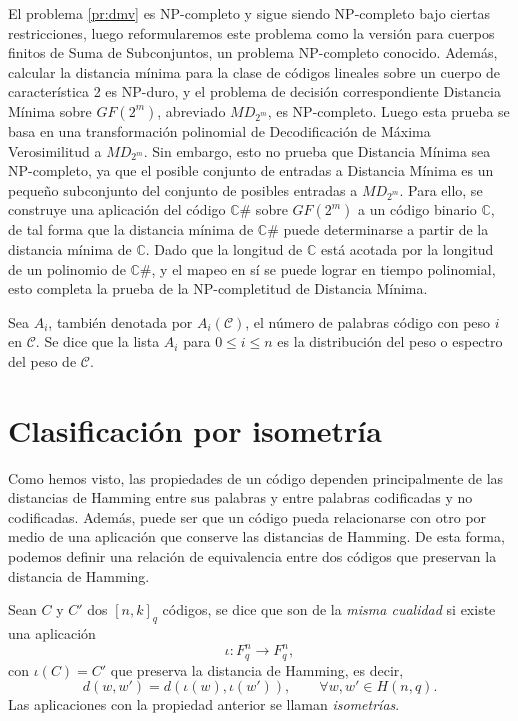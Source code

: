 El problema \ref{pr:dmv} es NP-completo y sigue siendo NP-completo bajo ciertas restricciones, luego reformularemos este problema como la versión para cuerpos finitos de Suma de Subconjuntos, un problema NP-completo conocido. Además, calcular la distancia mínima para la clase de códigos lineales sobre un cuerpo de característica 2 es NP-duro, y el problema de decisión correspondiente Distancia Mínima sobre $GF(2^m)$, abreviado $MD_{2^m}$, es NP-completo. Luego esta prueba se basa en una transformación polinomial de Decodificación de Máxima Verosimilitud a $MD_{2^m}$. Sin embargo, esto no prueba que Distancia Mínima sea NP-completo, ya que el posible conjunto de entradas a Distancia Mínima es un pequeño subconjunto del conjunto de posibles entradas a $MD_{2^m}$. Para ello, se construye una aplicación del código $\mathbb{C\#}$ sobre $GF(2^m)$ a un código binario $\mathbb{C}$, de tal forma que la distancia mínima de $\mathbb{C\#}$ puede determinarse a partir de la distancia mínima de $\mathbb{C}$. Dado que la longitud de $\mathbb{C}$ está acotada por la longitud de un polinomio de $\mathbb{C\#}$, y el mapeo en sí se puede lograr en tiempo polinomial, esto completa la prueba de la NP-completitud de Distancia Mínima.


\begin{definition}
    Sea $A_i$, también denotada por $A_i(\mathcal{C})$, el número de palabras código con peso $i$ en $\mathcal{C}$. Se dice que la lista $A_i$ para $0 \leq i \leq n$ es la distribución del peso o espectro del peso de $\mathcal{C}$.
\end{definition}

\section{Clasificación por isometría}

Como hemos visto, las propiedades de un código dependen principalmente de las distancias de Hamming entre sus palabras y entre palabras codificadas y no codificadas. Además, puede ser que un código pueda relacionarse con otro por medio de una aplicación que conserve las distancias de Hamming. De esta forma, podemos definir una relación de equivalencia entre dos códigos que preservan la distancia de Hamming.

Sean $C$ y $C'$ dos $[n,k]_q$ códigos, se dice que son de la \emph{misma cualidad} si existe una aplicación
\[
    \iota : F^n_q \rightarrow F^n_q,
\]
con $\iota(C) = C'$ que preserva la distancia de Hamming, es decir, 
\[
    d(w,w') = d(\iota (w), \iota(w')), \qquad \forall w,w' \in H(n,q).
\]
Las aplicaciones con la propiedad anterior se llaman \emph{isometrías}.

